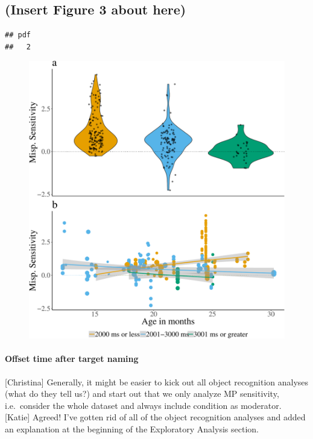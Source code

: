 \documentclass[man]{apa6}
\let\oldparagraph\paragraph
\renewcommand{\paragraph}[1]{\oldparagraph{#1}\mbox{}}
\theoremstyle{definition}
\theoremstyle{definition}
\theoremstyle{definition}
\theoremstyle{remark}
\begin{document}
\subsection{(Insert Figure 3 about
here)}\label{insert-figure-3-about-here}

\begin{verbatim}
## pdf 
##   2
\end{verbatim}

\begin{figure}
\centering
\includegraphics{Paper_Analyses_files/figure-latex/Plot_post_name_cond_age-1.pdf}
\caption{}
\end{figure}

\paragraph{Offset time after target
naming}\label{offset-time-after-target-naming}

{[}Christina{]} Generally, it might be easier to kick out all object
recognition analyses (what do they tell us?) and start out that we only
analyze MP sensitivity, i.e.~consider the whole dataset and always
include condition as moderator. {[}Katie{]} Agreed! I've gotten rid of
all of the object recognition analyses and added an explanation at the
beginning of the Exploratory Analysis section.
\end{document}

